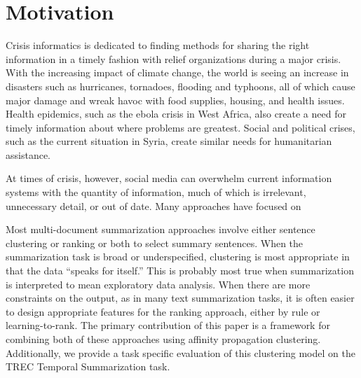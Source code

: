 \section{Motivation}


Crisis informatics\cite{?} is dedicated to finding methods for sharing the
right information in a timely fashion with relief organizations during a major crisis. With the
increasing impact of climate change, the world is seeing an increase in
disasters such as hurricanes, tornadoes, flooding and typhoons, all of which
cause major damage and wreak havoc with food supplies, housing, and health
issues. Health epidemics, such as the ebola crisis in West Africa, also create
a need for timely information about where problems are greatest. Social and
political 
crises, such as the current situation in Syria, create similar needs for
humanitarian assistance.

At times of crisis, however, social media can overwhelm current information
systems with the quantity of information, much of which is irrelevant,
unnecessary detail, or out of date. Many approaches have focused on 








Most multi-document summarization approaches involve either sentence 
clustering or ranking or both to select summary sentences.
When the summarization task
is broad or underspecified, clustering is most appropriate in that the data
``speaks for itself.'' This is probably most true when summarization is 
interpreted to mean exploratory data analysis. 
When there are more constraints on the output, as in many text summarization
tasks,
it is often easier to design appropriate features for the ranking approach, 
either by rule or learning-to-rank. The primary contribution of this paper
is a framework for combining both of these approaches using affinity
propagation clustering. Additionally, we provide a task specific evaluation
of this clustering model on the TREC Temporal Summarization task. 


